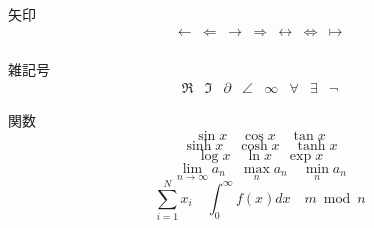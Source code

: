 \documentclass[12pt,a4j,twocolumn]{jarticle}
\begin{document}
矢印
\[
\begin{array}{cccccccc}
\leftarrow & \Leftarrow & \rightarrow & \Rightarrow & \leftrightarrow & \Leftrightarrow & \mapsto \\
\end{array}
\]

雑記号
\[
\begin{array}{cccccccc}
\Re & \Im & \partial & \angle & \infty & \forall & \exists & \neg
\end{array}
\]

関数
\[
\sin x \quad \cos x \quad \tan x
\] \[
\sinh x \quad \cosh x \quad \tanh x
\] \[
\log x \quad \ln x \quad \exp x
\] \[
\lim_{n \rightarrow \infty} a_n \quad \max_n a_n \quad \min_n a_n 
\] \[
\sum_{i=1}^{N} x_i \quad \int_{0}^{\infty} f(x) dx \quad m \bmod n
\]
\end{document}
